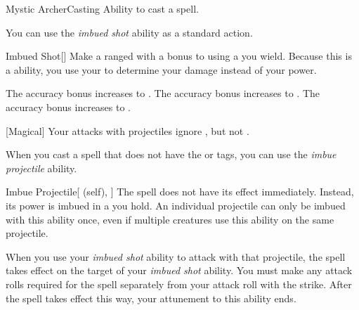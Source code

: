     \begin{feat}{Mystic Archer}{Casting}
        \featpre Ability to cast a spell.

         You can use the \textit{imbued shot} ability as a standard action.
        \begin{freeability}{Imbued Shot}[]
            Make a ranged  with a  bonus to  using a  you wield.
            Because this is a  ability, you use your   to determine your damage instead of your  power.

            \rankline
             The accuracy bonus increases to .
             The accuracy bonus increases to .
             The accuracy bonus increases to .
        \end{freeability}

        [Magical] Your attacks with projectiles ignore , but not .

         When you cast a spell that does not have the  or  tags,
            you can use the \textit{imbue projectile} ability.
        \begin{attuneability}{Imbue Projectile}[ (self), ]
            The spell does not have its effect immediately.
            Instead, its power is imbued in a  you hold.
            An individual projectile can only be imbued with this ability once, even if multiple creatures use this ability on the same projectile.

            When you use your \textit{imbued shot} ability to attack with that projectile, the spell takes effect on the target of your \textit{imbued shot} ability.
            You must make any attack rolls required for the spell separately from your attack roll with the strike.
            After the spell takes effect this way, your attunement to this ability ends.
        \end{attuneability}



\end{feat}
